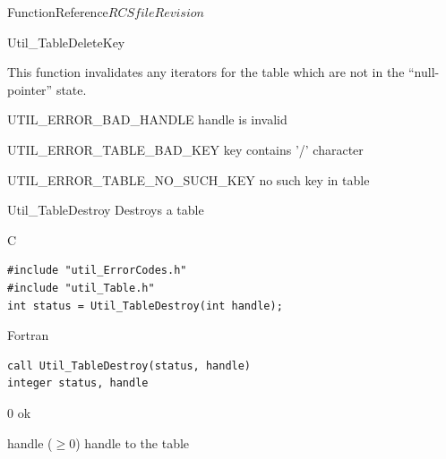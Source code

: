 \begin{cactuspart}{FunctionReference}{$RCSfile$}{$Revision$}
\begin{FunctionDescription}{Util\_TableDeleteKey}
\begin{Discussion}
This function invalidates any iterators for the table which are
not in the ``null-pointer'' state.
\end{Discussion}

\begin{ErrorSection}
\begin{Error}{UTIL\_ERROR\_BAD\_HANDLE}
handle is invalid
\end{Error}
\begin{Error}{UTIL\_ERROR\_TABLE\_BAD\_KEY}
key contains '/' character
\end{Error}
\begin{Error}{UTIL\_ERROR\_TABLE\_NO\_SUCH\_KEY}
no such key in table
\end{Error}
\end{ErrorSection}
\end{FunctionDescription}


\begin{FunctionDescription}{Util\_TableDestroy}
\label{Util-TableDestroy}
Destroys a table

\begin{SynopsisSection}
\begin{Synopsis}{C}
\begin{verbatim}
#include "util_ErrorCodes.h"
#include "util_Table.h"
int status = Util_TableDestroy(int handle);
\end{verbatim}
\end{Synopsis}
\begin{Synopsis}{Fortran}
\begin{verbatim}
call Util_TableDestroy(status, handle)
integer status, handle
\end{verbatim}
\end{Synopsis}
\end{SynopsisSection}

\begin{ResultSection}
\begin{Result}{\rm 0}
ok
\end{Result}
\end{ResultSection}

\begin{ParameterSection}
\begin{Parameter}{handle ($\ge 0$)}
handle to the table
\end{Parameter}
\end{ParameterSection}


\end{FunctionDescription}
\end{cactuspart}
